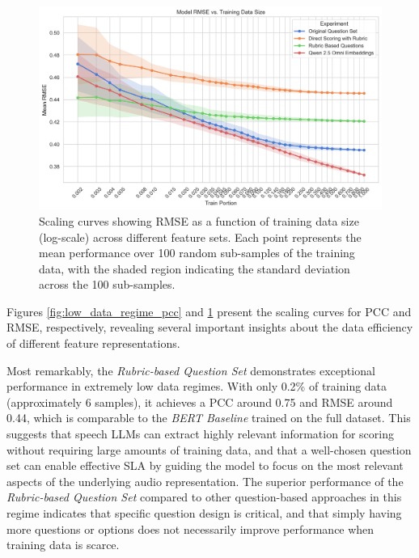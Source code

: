 \documentclass{report}
\begin{document}
\begin{figure}[h]
  \centering
  \includegraphics[width=1\linewidth]{images/low_data_regime_rmse.png}
  \caption{Scaling curves showing RMSE as a function of training data size (log-scale) across different feature sets. Each point represents the mean performance over 100 random sub-samples of the training data, with the shaded region indicating the standard deviation across the 100 sub-samples.}
  \label{fig: fig:low_data_regime_rmse}
\end{figure}

Figures \ref{fig:low_data_regime_pcc} and \ref{fig: fig:low_data_regime_rmse} present the scaling curves for PCC and RMSE, respectively, revealing several important insights about the data efficiency of different feature representations.

Most remarkably, the \emph{Rubric-based Question Set} demonstrates exceptional performance in extremely low data regimes. With only 0.2\% of training data (approximately 6 samples), it achieves a PCC around 0.75 and RMSE around 0.44, which is comparable to the \emph{BERT Baseline} trained on the full dataset. This suggests that speech LLMs can extract highly relevant information for scoring without requiring large amounts of training data, and that a well-chosen question set can enable effective SLA by guiding the model to focus on the most relevant aspects of the underlying audio representation. The superior performance of the \emph{Rubric-based Question Set} compared to other question-based approaches in this regime indicates that specific question design is critical, and that simply having more questions or options does not necessarily improve performance when training data is scarce.
\end{document}
